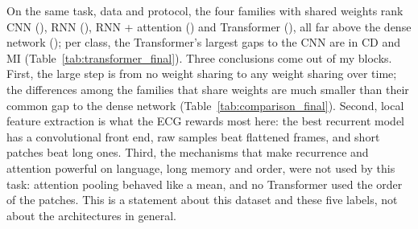 On the same task, data and protocol, the four families with shared weights rank CNN
(\cnnFinalTestMacroAurocMean{}), RNN (\rnnFinalTestMacroAurocMean{}), RNN + attention
(\rnnAttnfinalTestMacroAurocMean{}) and Transformer (\transformerFinalTestMacroAurocMean{}), all far
above the dense network (\denseFinalTestMacroAurocMean{}); per class, the Transformer's largest gaps to
the CNN are in CD and MI (Table~\ref{tab:transformer_final}). Three conclusions come out of my blocks.
First, the large step is from no weight sharing to any weight sharing over time; the differences among
the families that share weights are much smaller than their common gap to the dense network
(Table~\ref{tab:comparison_final}). Second, local feature extraction is
what the ECG rewards most here: the best recurrent model has a convolutional front end, raw samples beat
flattened frames, and short patches beat long ones. Third, the mechanisms that make recurrence and
attention powerful on language, long memory and order, were not used by this task: attention pooling
behaved like a mean, and no Transformer used the order of the patches. This is a statement about this
dataset and these five labels, not about the architectures in general.
